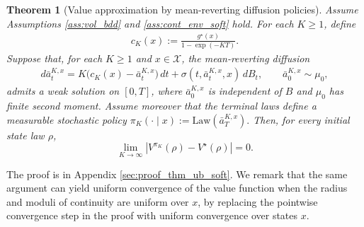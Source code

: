 \documentclass{article}
\newtheorem{thm}{Theorem}[section]
\newcommand{\1}{\mathbbm{1}}
\newcommand{\Law}{\mathrm{Law}}
\numberwithin{equation}{section}
\def\to{\rightarrow}
\begin{document}
\begin{thm}[Value approximation by mean-reverting diffusion policies] 
\label{thm:converge}
Assume Assumptions \ref{ass:vol_bdd} and \ref{ass:cont_env_soft} hold.
\label{thm:ub_soft}
For each \(K\ge1\), define
\begin{eqnarray}\label{eq:cK}
    c_K(x):=\frac{g^\star(x)}{1-\exp(-KT)}.
\end{eqnarray}
Suppose that, for each \(K\ge1\) and \(x\in\mathcal X\), the mean-reverting diffusion
\begin{eqnarray}
\label{eq:mean-reversion}
    d\bar a_t^{K,x}
    =
    K\bigl(c_K(x)-\bar a_t^{K,x}\bigr)\,dt
    +
    \sigma(t,\bar a_t^{K,x},x)\,dB_t,
    \qquad
    \bar a_0^{K,x}\sim\mu_{0},
\end{eqnarray}
admits a weak solution on \([0,T]\), where \(\bar a_0^{K,x}\) is independent of \(B\) and \(\mu_0\) has finite second moment. 
Assume moreover that the terminal laws define a measurable stochastic policy
$\pi_K(\cdot\mid x):=\Law(\bar a_T^{K,x}).$  Then, for every
initial state law \(\rho\),
\[
    \lim_{K\to\infty}
    \left|
        V^{\pi_K}(\rho)-V^{\star}(\rho)
    \right|
    =
    0.
\]
\end{thm}
The proof is in Appendix \ref{sec:proof_thm_ub_soft}. We remark that the same argument can yield uniform convergence of the value function when the radius and moduli of continuity are uniform over $x$, by replacing the pointwise convergence step in the proof with uniform convergence over states $x$. %
\end{document}
